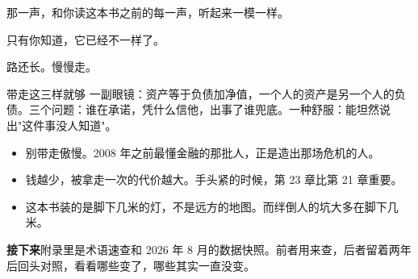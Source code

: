 那一声，和你读这本书之前的每一声，听起来一模一样。

只有你知道，它已经不一样了。

路还长。慢慢走。

\begin{takeaway}{带走这三样就够}
一副眼镜：资产等于负债加净值，一个人的资产是另一个人的负债。三个问题：谁在承诺，凭什么信他，出事了谁兜底。一种舒服：能坦然说出"这件事没人知道"。

\begin{itemize}
  \item 别带走傲慢。2008 年之前最懂金融的那批人，正是造出那场危机的人。
  \item 钱越少，被拿走一次的代价越大。手头紧的时候，第 23 章比第 21 章重要。
  \item 这本书装的是脚下几米的灯，不是远方的地图。而绊倒人的坑大多在脚下几米。
\end{itemize}

\end{takeaway}

\begin{bridgebox}
\textbf{接下来}附录里是术语速查和 2026 年 8 月的数据快照。前者用来查，后者留着两年后回头对照，看看哪些变了，哪些其实一直没变。
\end{bridgebox}

